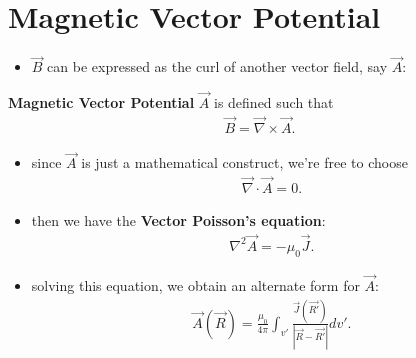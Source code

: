 \documentclass[10pt]{article}
\begin{document}
\section{Magnetic Vector Potential}
\begin{itemize}
    \item $\vec{B} $ can be expressed as the curl of another vector field, say $ \vec{A} $: 
\end{itemize}
\begin{definition}
    \textbf{Magnetic Vector Potential} $ \vec{A} $ is defined such that
        \begin{gather*}
            \vec{B}  = \vec{\nabla } \times \vec{A} 
        .\end{gather*}
    \begin{itemize}
        \item since $\vec{A} $ is just a mathematical construct, we're free to choose 
            \begin{gather*}
                \vec{\nabla } \cdot \vec{A} =0 
            .\end{gather*}
        \item then we have the \textbf{Vector Poisson's equation}:
            \begin{gather*}
                \nabla ^2 \vec{A} = -\mu_0 \vec{J} 
            .\end{gather*}
        \item solving this equation, we obtain an alternate form for $\vec{A}$: 
            \begin{gather*}
                \vec{A}(\vec{R} ) = \frac{\mu_0}{4\pi} \int_{v'} \frac{\vec{J}(\vec{R'})}{|\vec{R} - \vec{R'}|}dv' 
            .\end{gather*}
    \end{itemize}
\end{definition}
\end{document}
